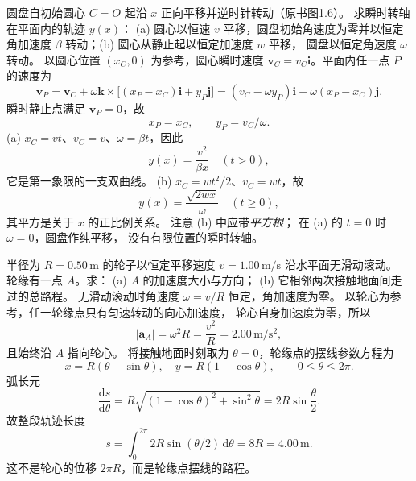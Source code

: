 
圆盘自初始圆心 $C=O$ 起沿 $x$ 正向平移并逆时针转动（原书图1.6）。
求瞬时转轴在平面内的轨迹 $y(x)$：
(a) 圆心以恒速 $v$ 平移，圆盘初始角速度为零并以恒定角加速度
$\beta$ 转动；(b) 圆心从静止起以恒定加速度 $w$ 平移，
圆盘以恒定角速度 $\omega$ 转动。
\exsolution
以圆心位置 $(x_C,0)$ 为参考，圆心瞬时速度
$\bm v_C=v_C\bm i$。平面内任一点 $P$
的速度为
\[
 \bm v_P=\bm v_C+\omega\bm k\times
 \bigl[(x_P-x_C)\bm i+y_P\bm j\bigr]
 =(v_C-\omega y_P)\bm i+\omega(x_P-x_C)\bm j.
\]
瞬时静止点满足 $\bm v_P=0$，故
\[
 x_P=x_C,\qquad y_P=v_C/\omega.
\]
(a) $x_C=vt$、$v_C=v$、$\omega=\beta t$，因此
\[
 \boxed{y(x)=\frac{v^2}{\beta x}}\quad(t>0),
\]
它是第一象限的一支双曲线。
(b) $x_C=wt^2/2$、$v_C=wt$，故
\[
 \boxed{y(x)=\frac{\sqrt{2wx}}{\omega}}\quad(t\ge0),
\]
其平方是关于 $x$ 的正比例关系。
\excheck 注意 (b) 中应带\emph{平方根}；
在 (a) 的 $t=0$ 时 $\omega=0$，圆盘作纯平移，
没有有限位置的瞬时转轴。
\begin{center}
\end{center}

半径为 $R=0.50\,\mathrm m$ 的轮子以恒定平移速度
$v=1.00\,\mathrm{m/s}$ 沿水平面无滑动滚动。
轮缘有一点 $A$。求：
(a) $A$ 的加速度大小与方向；
(b) 它相邻两次接触地面间走过的总路程。
\exsolution
无滑动滚动时角速度 $\omega=v/R$ 恒定，角加速度为零。
以轮心为参考，任一轮缘点只有匀速转动的向心加速度，
轮心自身加速度为零，所以
\[
 \boxed{|\bm a_A|=\omega^2R=\frac{v^2}{R}
 =2.00\,\mathrm{m/s^2}},
\]
且始终沿 $A$ 指向轮心。
将接触地面时刻取为 $\theta=0$，轮缘点的摆线参数方程为
\[
 x=R(\theta-\sin\theta),\quad
 y=R(1-\cos\theta),\qquad 0\le\theta\le2\pi.
\]
弧长元
\[
 \frac{\mathrm ds}{\mathrm d\theta}
 =R\sqrt{(1-\cos\theta)^2+\sin^2\theta}
 =2R\sin\frac\theta2.
\]
故整段轨迹长度
\[
 \boxed{s=\int_0^{2\pi}2R\sin(\theta/2)\,\mathrm d\theta
 =8R=4.00\,\mathrm m.}
\]
\excheck 这不是轮心的位移 $2\pi R$，而是轮缘点摆线的路程。

